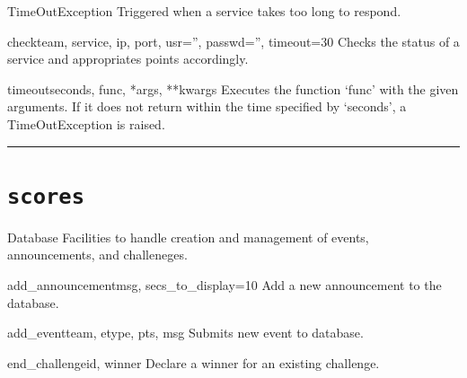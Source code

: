 \documentclass[letterpaper,10pt,english]{manual}
\begin{document}
\hypertarget{xscore.checkers.TimeOutException}{}\begin{excdesc}{TimeOutException}
Triggered when a service takes too long to respond.
\end{excdesc}

\hypertarget{xscore.checkers.check}{}\begin{funcdesc}{check}{team, service, ip, port, usr='', passwd='', timeout=30}
Checks the status of a service and appropriates points accordingly.
\end{funcdesc}

\hypertarget{xscore.checkers.timeout}{}\begin{funcdesc}{timeout}{seconds, func, *args, **kwargs}
Executes the function `func' with the given arguments.  If it
does not return within the time specified by `seconds', a
TimeOutException is raised.
\end{funcdesc}


\bigskip\hrule{}\bigskip



\section{\texttt{scores}}
\hypertarget{module-xscore.scores}{}
\modulesynopsis{}
Database Facilities to handle creation and management of events, 
announcements, and challeneges.

\hypertarget{xscore.scores.add_announcement}{}\begin{funcdesc}{add\_announcement}{msg, secs\_to\_display=10}
Add a new announcement to the database.
\end{funcdesc}

\hypertarget{xscore.scores.add_event}{}\begin{funcdesc}{add\_event}{team, etype, pts, msg}
Submits new event to database.
\end{funcdesc}

\hypertarget{xscore.scores.end_challenge}{}\begin{funcdesc}{end\_challenge}{id, winner}
Declare a winner for an existing challenge.
\end{funcdesc}
\end{document}
